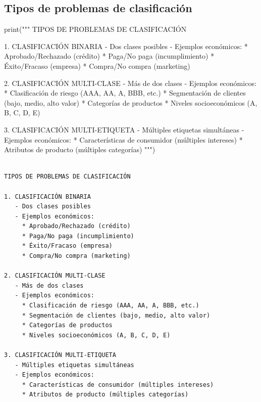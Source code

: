\documentclass[
  doc,
  floatsintext,
  longtable,
  a4paper,
  nolmodern,
  notxfonts,
  notimes,
  12pt,
  colorlinks=true,linkcolor=blue,citecolor=blue,urlcolor=blue]{apa7}
\newenvironment{Shaded}{\begin{snugshade}}{\end{snugshade}}
\newcommand{\BuiltInTok}[1]{\textcolor[rgb]{0.00,0.23,0.31}{#1}}
\newcommand{\NormalTok}[1]{\textcolor[rgb]{0.00,0.23,0.31}{#1}}
\newcommand{\StringTok}[1]{\textcolor[rgb]{0.13,0.47,0.30}{#1}}
\begin{document}
\subsection{Tipos de problemas de
clasificación}\label{tipos-de-problemas-de-clasificaciuxf3n}

\begin{Shaded}
\begin{Highlighting}[]
\BuiltInTok{print}\NormalTok{(}\StringTok{"""}
\StringTok{TIPOS DE PROBLEMAS DE CLASIFICACIÓN}

\StringTok{1. CLASIFICACIÓN BINARIA}
\StringTok{   {-} Dos clases posibles}
\StringTok{   {-} Ejemplos económicos:}
\StringTok{     * Aprobado/Rechazado (crédito)}
\StringTok{     * Paga/No paga (incumplimiento)}
\StringTok{     * Éxito/Fracaso (empresa)}
\StringTok{     * Compra/No compra (marketing)}

\StringTok{2. CLASIFICACIÓN MULTI{-}CLASE}
\StringTok{   {-} Más de dos clases}
\StringTok{   {-} Ejemplos económicos:}
\StringTok{     * Clasificación de riesgo (AAA, AA, A, BBB, etc.)}
\StringTok{     * Segmentación de clientes (bajo, medio, alto valor)}
\StringTok{     * Categorías de productos}
\StringTok{     * Niveles socioeconómicos (A, B, C, D, E)}

\StringTok{3. CLASIFICACIÓN MULTI{-}ETIQUETA}
\StringTok{   {-} Múltiples etiquetas simultáneas}
\StringTok{   {-} Ejemplos económicos:}
\StringTok{     * Características de consumidor (múltiples intereses)}
\StringTok{     * Atributos de producto (múltiples categorías)}
\StringTok{"""}\NormalTok{)}
\end{Highlighting}
\end{Shaded}

\begin{verbatim}

TIPOS DE PROBLEMAS DE CLASIFICACIÓN

1. CLASIFICACIÓN BINARIA
   - Dos clases posibles
   - Ejemplos económicos:
     * Aprobado/Rechazado (crédito)
     * Paga/No paga (incumplimiento)
     * Éxito/Fracaso (empresa)
     * Compra/No compra (marketing)

2. CLASIFICACIÓN MULTI-CLASE
   - Más de dos clases
   - Ejemplos económicos:
     * Clasificación de riesgo (AAA, AA, A, BBB, etc.)
     * Segmentación de clientes (bajo, medio, alto valor)
     * Categorías de productos
     * Niveles socioeconómicos (A, B, C, D, E)

3. CLASIFICACIÓN MULTI-ETIQUETA
   - Múltiples etiquetas simultáneas
   - Ejemplos económicos:
     * Características de consumidor (múltiples intereses)
     * Atributos de producto (múltiples categorías)
\end{verbatim}
\end{document}
